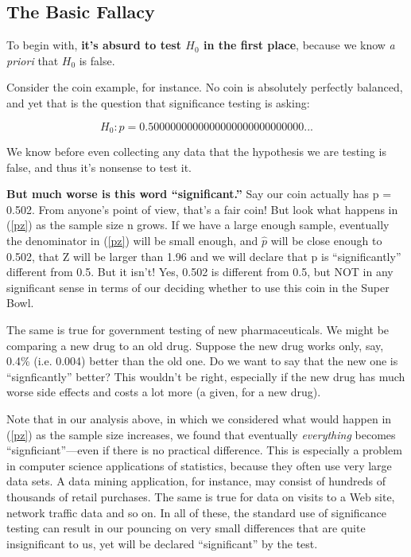 \subsection{The Basic Fallacy}

To begin with, {\bf it's absurd to test $H_0$ in the first place},
because we know {\it a priori} that $H_0$ is false.  

Consider the coin example, for instance.  No coin is absolutely
perfectly balanced, and yet that is the question that significance
testing is asking:

\begin{equation}
H_0: p = 0.5000000000000000000000000000...  
\end{equation}

We know before even collecting any data that the hypothesis we are
testing is false, and thus it's nonsense to test it.

{\bf But much worse is this word ``significant.''}  Say our coin actually
has p = 0.502.  From anyone's point of view, that's a fair coin!  But
look what happens in (\ref{pz}) as the sample size n grows.  If we have
a large enough sample, eventually the denominator in (\ref{pz}) will be
small enough, and $\widehat{p}$ will be close enough to 0.502, that Z will
be larger than 1.96 and we will declare that p is ``significantly''
different from 0.5.  But it isn't!  Yes, 0.502 is different from 0.5, but
NOT in any significant sense in terms of our deciding whether to use
this coin in the Super Bowl.

The same is true for government testing of new pharmaceuticals.  We
might be comparing a new drug to an old drug.  Suppose the new drug
works only, say, 0.4\% (i.e. 0.004) better than the old one.  Do we want
to say that the new one is ``signficantly'' better?  This wouldn't be
right, especially if the new drug has much worse side effects and costs
a lot more (a given, for a new drug).

Note that in our analysis above, in which we considered what would
happen in (\ref{pz}) as the sample size increases, we found that
eventually {\it everything} becomes ``signficiant''---even if there is no
practical difference.  This is especially a problem in computer science
applications of statistics, because they often use very large data sets.
A data mining application, for instance, may consist of hundreds of
thousands of retail purchases.  The same is true for data on visits to a
Web site, network traffic data and so on.  In all of these, the standard
use of significance testing can result in our pouncing on very small
differences that are quite insignificant to us, yet will be declared
``significant'' by the test.

